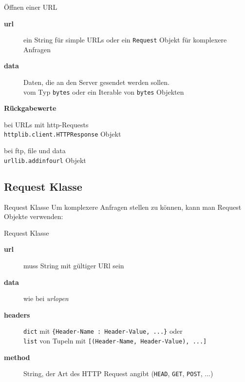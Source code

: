 \begin{frame}[fragile]{\"Offnen einer URL}
	\begin{description}
		\item[\textbf{url}] ein String f\"ur simple URLs oder ein \texttt{Request} Objekt f\"ur komplexere Anfragen
		\item[\textbf{data}] Daten, die an den Server gesendet werden sollen. \\
		vom Typ \texttt{bytes} oder ein Iterable von \texttt{bytes} Objekten \\[.75cm]
	\end{description}
	\textbf{R\"ückgabewerte}
	\begin{description}
		\item bei URLs mit http-Requests \\
		\hspace*{1cm}\texttt{httplib.client.HTTPResponse} Objekt
		\item bei ftp, file und data \\
		\hspace*{1cm}\texttt{urllib.addinfourl} Objekt
	\end{description}
\end{frame}

\subsection{Request Klasse}
\begin{frame}{Request Klasse}
	Um komplexere Anfragen stellen zu k\"onnen, kann man Request Objekte verwenden:
	
\end{frame}

\begin{frame}{Request Klasse}
	\begin{description}
		\item[\textbf{url}] muss String mit g\"ultiger URl sein
		\item[\textbf{data}] wie bei \textit{urlopen}
		\item[\textbf{headers}] \texttt{dict} mit \texttt{\{Header-Name : Header-Value, ...\}} oder \\
		\texttt{list} von Tupeln mit \texttt{[(Header-Name, Header-Value), ...]}
		\item[\textbf{method}] String, der Art des HTTP Request angibt (\texttt{HEAD}, \texttt{GET}, \texttt{POST}, ...)
	\end{description}
\end{frame}

